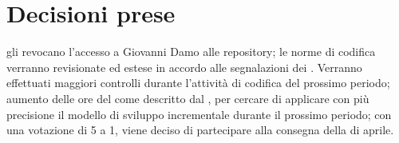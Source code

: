 \documentclass[a4paper,11pt]{article}
\begin{document}
	\section{Decisioni prese}
		\begin{itemize}
	        \itemVI gli \amministratori{} revocano l'accesso a Giovanni Damo alle repository; 
	        \itemVI le norme di codifica verranno revisionate ed estese in accordo alle segnalazioni dei \programmatori. Verranno effettuati maggiori controlli durante l'attività di codifica del prossimo periodo;
	        \itemVI aumento delle ore del \responsabile{} come descritto dal \pdpvtre{}, per cercare di applicare con più precisione il modello di sviluppo incrementale durante il prossimo periodo;
	        \itemVI con una votazione di 5 a 1, viene deciso di partecipare alla consegna della \revaqual{} di aprile.
		\end{itemize}
\end{document}
